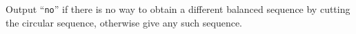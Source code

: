 
	Output ``\texttt{no}'' if there is no way to obtain a different balanced
	sequence by cutting the circular sequence,
	otherwise give any such sequence.
